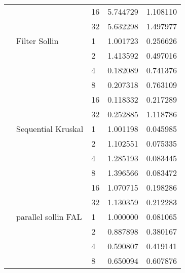 \begin{tabular}{lllrr}
                                                       &                     & 16 &  5.744729 &  1.108110 \\
                                                       &                     & 32 &  5.632298 &  1.497977 \\
                                                       & Filter Sollin & 1  &  1.001723 &  0.256626 \\
                                                       &                     & 2  &  1.413592 &  0.497016 \\
                                                       &                     & 4  &  0.182089 &  0.741376 \\
                                                       &                     & 8  &  0.207318 &  0.763109 \\
                                                       &                     & 16 &  0.118332 &  0.217289 \\
                                                       &                     & 32 &  0.252885 &  1.118786 \\
                                                       & Sequential Kruskal & 1  &  1.001198 &  0.045985 \\
                                                       &                     & 2  &  1.102551 &  0.075335 \\
                                                       &                     & 4  &  1.285193 &  0.083445 \\
                                                       &                     & 8  &  1.396566 &  0.083472 \\
                                                       &                     & 16 &  1.070715 &  0.198286 \\
                                                       &                     & 32 &  1.130359 &  0.212283 \\
                                                       & parallel sollin FAL & 1  &  1.000000 &  0.081065 \\
                                                       &                     & 2  &  0.887898 &  0.380167 \\
                                                       &                     & 4  &  0.590807 &  0.419141 \\
                                                       &                     & 8  &  0.650094 &  0.607876 \\

\end{tabular}
